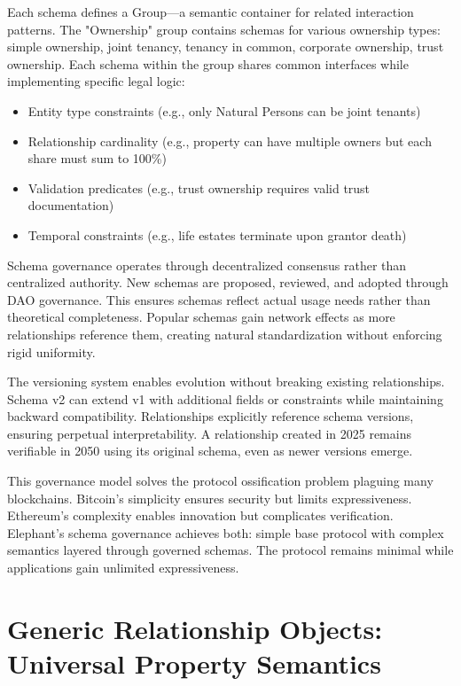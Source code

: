 Each schema defines a Group—a semantic container for related interaction patterns. The "Ownership" group contains schemas for various ownership types: simple ownership, joint tenancy, tenancy in common, corporate ownership, trust ownership. Each schema within the group shares common interfaces while implementing specific legal logic:

\begin{itemize}
\item Entity type constraints (e.g., only Natural Persons can be joint tenants)
\item Relationship cardinality (e.g., property can have multiple owners but each share must sum to 100\%)
\item Validation predicates (e.g., trust ownership requires valid trust documentation)
\item Temporal constraints (e.g., life estates terminate upon grantor death)
\end{itemize}

Schema governance operates through decentralized consensus rather than centralized authority. New schemas are proposed, reviewed, and adopted through DAO governance. This ensures schemas reflect actual usage needs rather than theoretical completeness. Popular schemas gain network effects as more relationships reference them, creating natural standardization without enforcing rigid uniformity.

The versioning system enables evolution without breaking existing relationships. Schema v2 can extend v1 with additional fields or constraints while maintaining backward compatibility. Relationships explicitly reference schema versions, ensuring perpetual interpretability. A relationship created in 2025 remains verifiable in 2050 using its original schema, even as newer versions emerge.

This governance model solves the protocol ossification problem plaguing many blockchains. Bitcoin's simplicity ensures security but limits expressiveness. Ethereum's complexity enables innovation but complicates verification. Elephant's schema governance achieves both: simple base protocol with complex semantics layered through governed schemas. The protocol remains minimal while applications gain unlimited expressiveness.

\section{Generic Relationship Objects: Universal Property Semantics}

